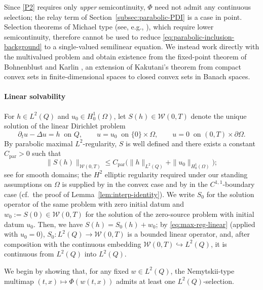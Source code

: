\documentclass[11pt]{elsarticle}
\theoremstyle{definition}
\theoremstyle{remark}
\numberwithin{equation}{section}
\begin{document}
Since \ref{P2} requires only \emph{upper} semicontinuity, $\Phi$
need not admit any continuous selection; the relay term of
Section~\ref{subsec:parabolic-PDI} is a case in point. Selection
theorems of Michael type (see, e.g., \cite[Lemma~2.1]{deimling_1992}),
which require lower semicontinuity, therefore cannot be used to reduce
\eqref{eq:parabolic-inclusion-background} to a single-valued semilinear
equation. We instead work directly with the multivalued problem and
obtain existence from the fixed-point theorem of Bohnenblust and Karlin
\cite{bohnenblust_karlin_1950}, an extension of Kakutani's theorem
\cite{kakutani_1941} from compact convex sets in finite-dimensional
spaces to closed convex sets in Banach spaces.

\paragraph{Linear solvability}
For $h\in L^2(Q)$ and $u_0\in H_0^1(\Omega)$,
let $S(h)\in\mathcal{W}(0,T)$ denote the unique
solution of the linear Dirichlet problem
\[
\partial_t u-\Delta u=h \ \text{ on } Q,
\qquad u=u_0 \ \text{ on }\{0\}\times\Omega,
\qquad u=0 \ \text{ on }(0,T)\times\partial\Omega.
\]
By parabolic maximal $L^2$-regularity, $S$ is well defined and there
exists a constant $C_{\mathrm{par}}>0$ such that
\begin{equation}\label{eq:max-reg-linear}
	\|S(h)\|_{\mathcal{W}(0,T)}
	\le
	C_{\mathrm{par}}\bigl(\|h\|_{L^2(Q)}+\|u_0\|_{H_0^1(\Omega)}\bigr);
\end{equation}
see \cite[Section~7.1.3, Theorem~5]{Evans} for smooth domains; the
$H^2$ elliptic regularity required under our standing assumptions on
$\Omega$ is supplied by \cite[Theorem~3.2.1.2]{Grisvard1985} in the
convex case and by \cite[Theorem~2.4.2.5]{Grisvard1985} in the
$C^{1,1}$-boundary case (cf.\ the proof of
Lemma~\ref{lem:interp-identity}). We write $S_0$ for the solution
operator of the same problem with zero initial datum and
$w_0:=S(0)\in\mathcal{W}(0,T)$ for the solution of the zero-source
problem with initial datum $u_0$. Then, we have $S(h)=S_0(h)+w_0$; by
\eqref{eq:max-reg-linear} (applied with $u_0=0$), $S_0:L^2(Q)\to
\mathcal{W}(0,T)$ is a bounded linear operator, and, after composition
with the continuous embedding $\mathcal{W}(0,T)\hookrightarrow L^2(Q)$,
it is continuous from $L^2(Q)$ into $L^2(Q)$.

We begin by showing that, for any fixed $w\in L^2(Q)$, the
Nemytskii-type multimap $(t,x)\mapsto\Phi(w(t,x))$ admits at least one
$L^2(Q)$-selection.
\end{document}
